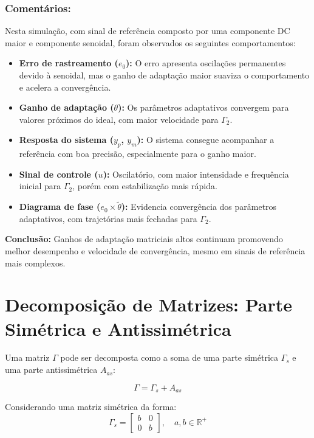 \documentclass[10pt]{article}
\begin{document}
\subsubsection{Comentários:}

Nesta simulação, com sinal de referência composto por uma componente DC maior e componente senoidal, foram observados os seguintes comportamentos:

\begin{itemize}
    \item \textbf{Erro de rastreamento ($e_0$):} O erro apresenta oscilações permanentes devido à senoidal, mas o ganho de adaptação maior suaviza o comportamento e acelera a convergência.

    \item \textbf{Ganho de adaptação ($\theta$):} Os parâmetros adaptativos convergem para valores próximos do ideal, com maior velocidade para $\Gamma_2$.

    \item \textbf{Resposta do sistema ($y_p$, $y_m$):} O sistema consegue acompanhar a referência com boa precisão, especialmente para o ganho maior.

    \item \textbf{Sinal de controle ($u$):} Oscilatório, com maior intensidade e frequência inicial para $\Gamma_2$, porém com estabilização mais rápida.

    \item \textbf{Diagrama de fase ($e_0 \times \tilde{\theta}$):} Evidencia convergência dos parâmetros adaptativos, com trajetórias mais fechadas para $\Gamma_2$.
\end{itemize}

\textbf{Conclusão:} Ganhos de adaptação matriciais altos continuam promovendo melhor desempenho e velocidade de convergência, mesmo em sinais de referência mais complexos.
\newpage

\appendix
\section{Decomposição de Matrizes: Parte Simétrica e Antissimétrica}

Uma matriz $\Gamma$ pode ser decomposta como a soma de uma parte simétrica $\Gamma_s$ e uma parte antissimétrica $A_{as}$:

\begin{equation}
    \Gamma = \Gamma_s + A_{as}
\end{equation}

Considerando uma matriz simétrica da forma:
\begin{equation}
    \Gamma_s = 
    \begin{bmatrix}
        b & 0 \\
        0 & b
    \end{bmatrix}, \quad a, b \in \mathbb{R}^+
\end{equation}
\end{document}
